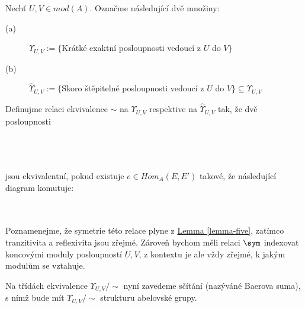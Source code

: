      \begin{dfn}
       Nechť $U,V\in mod(A)$. Označme následující dvě množiny:
       \begin{description}
         \item[(a)] $\Upsilon_{U,V}:=\{$Krátké exaktní posloupnosti vedoucí z $U$ do $V\}$
         \item[(b)] $\hat{\Upsilon}_{U,V}:=\{$Skoro štěpitelné posloupnosti vedoucí z $U$ do $V\}\subseteq \Upsilon_{U,V}$  
       \end{description}      
       Definujme relaci ekvivalence $\sim$ na $\Upsilon_{U,V}$ respektive na $\hat{\Upsilon}_{U,V}$ 
       tak, že dvě posloupnosti \\
           \centerline{} \\\\\\
       jsou ekvivalentní, pokud existuje $e\in Hom_A(E,E')$ takové, že 
       následující diagram komutuje:  \\
           \centerline{} \\\\
           
          Poznamenejme, že symetrie této relace plyne z 
          \hyperref[lemma-five]{Lemma \ref*{lemma-five}}, 
          zatímco tranzitivita a reflexivita jsou zřejmé. Zároveň bychom 
          měli relaci $\sym$ indexovat koncovými moduly  posloupností 
          $U,V$, z kontextu je ale vždy zřejmé, k jakým modulům se vztahuje.
          
         Na třídách ekvivalence $\Upsilon_{U,V}/\sim$ nyní zavedeme sčítání 
         (nazýváné Baerova suma), s nímž bude mít $\Upsilon_{U,V}/\sim$ strukturu  
         abelovské grupy.
         

\end{dfn}

